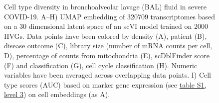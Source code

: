 \begin{figure}

\caption{Cell type diversity in bronchoalveolar lavage (BAL) fluid in severe COVID-19. A--H) UMAP embedding of 320709 transcriptomes based on a 30 dimensional latent space of an scVI model trained on 2000 HVGs. Data points have been colored by density (A), patient (B), disease outcome (C), library size (number of mRNA counts per cell, D), percentage of counts from mitochondria (E), scDblFinder score (F) and classification (G), cell cycle classification (H). Numeric variables have been averaged across overlapping data points. I) Cell type scores (AUC) based on marker gene expression (see \href{https://nubes.helmholtz-berlin.de/s/id9rrKNeditKMmF}{table S1, level 3}) on cell embeddings (as A).}
\end{figure}